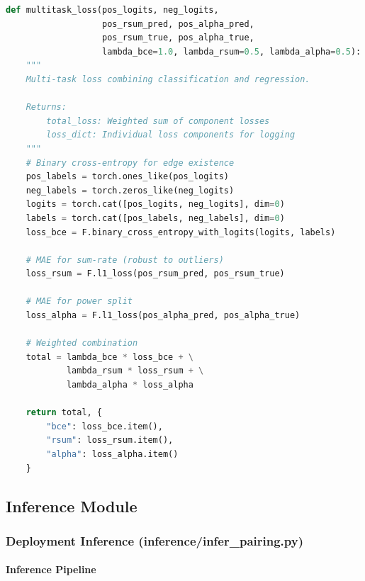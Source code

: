 \documentclass[12pt,a4paper]{article}
\begin{document}
\begin{lstlisting}[language=Python]
def multitask_loss(pos_logits, neg_logits, 
                   pos_rsum_pred, pos_alpha_pred,
                   pos_rsum_true, pos_alpha_true,
                   lambda_bce=1.0, lambda_rsum=0.5, lambda_alpha=0.5):
    """
    Multi-task loss combining classification and regression.
    
    Returns:
        total_loss: Weighted sum of component losses
        loss_dict: Individual loss components for logging
    """
    # Binary cross-entropy for edge existence
    pos_labels = torch.ones_like(pos_logits)
    neg_labels = torch.zeros_like(neg_logits)
    logits = torch.cat([pos_logits, neg_logits], dim=0)
    labels = torch.cat([pos_labels, neg_labels], dim=0)
    loss_bce = F.binary_cross_entropy_with_logits(logits, labels)
    
    # MAE for sum-rate (robust to outliers)
    loss_rsum = F.l1_loss(pos_rsum_pred, pos_rsum_true)
    
    # MAE for power split
    loss_alpha = F.l1_loss(pos_alpha_pred, pos_alpha_true)
    
    # Weighted combination
    total = lambda_bce * loss_bce + \
            lambda_rsum * loss_rsum + \
            lambda_alpha * loss_alpha
    
    return total, {
        "bce": loss_bce.item(), 
        "rsum": loss_rsum.item(), 
        "alpha": loss_alpha.item()
    }
\end{lstlisting}

\subsection{Inference Module}

\subsubsection{Deployment Inference (inference/infer\_pairing.py)}

\paragraph{Inference Pipeline}
\end{document}
